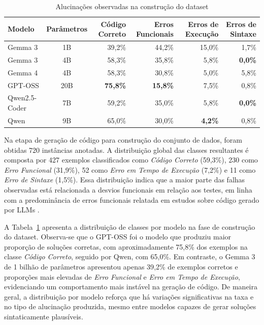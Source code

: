 \documentclass[conference]{IEEEtran}
\begin{document}
\begin{table}[!htbp]
    \centering
    \caption{Alucinações observadas na construção do dataset}
    \label{tab:dataset_construcao_modelos}

    \small
    \begin{tabular}{lcrrrr}
        \toprule
        \textbf{Modelo} & \textbf{Parâmetros} & \textbf{Código Correto} & \textbf{Erros Funcionais} & \textbf{Erros de Execução} & \textbf{Erros de Sintaxe} \\
        \midrule
        Gemma 3        & 1B   & 39{,}2\% & 44{,}2\% & 15{,}0\% & 1{,}7\% \\
        Gemma 3        & 4B   & 58{,}3\% & 35{,}8\% & 5{,}8\%  & \textbf{0{,}0\%} \\
        Gemma 4        & 4B   & 58{,}3\% & 30{,}8\% & 5{,}0\%  & 5{,}8\% \\
        GPT-OSS        & 20B  & \textbf{75{,}8\%} & \textbf{15{,}8\%} & 7{,}5\%  & 0{,}8\% \\
        Qwen2.5-Coder  & 7B   & 59{,}2\% & 35{,}0\% & 5{,}8\%  & \textbf{0{,}0\%} \\
        Qwen            & 9B   & 65{,}0\% & 30{,}0\% & \textbf{4{,}2\%} & 0{,}8\% \\
        \bottomrule
    \end{tabular}
\end{table}



Na etapa de geração de código para construção do conjunto de dados, foram obtidas 720 instâncias anotadas. A distribuição global das classes resultantes é composta por 427 exemplos classificados como \emph{Código Correto} (59{,}3\%), 230 como \emph{Erro Funcional} (31{,}9\%), 52 como \emph{Erro em Tempo de Execução} (7{,}2\%) e 11 como \emph{Erro de Sintaxe} (1{,}5\%). Essa distribuição indica que a maior parte das falhas observadas está relacionada a desvios funcionais em relação aos testes, em linha com a predominância de erros funcionais relatada em estudos sobre código gerado por LLMs \cite{2407.06153,2504.20799}.

A Tabela~\ref{tab:dataset_construcao_modelos} apresenta a distribuição de classes por modelo na fase de construção do dataset. Observa-se que o GPT-OSS foi o modelo que produziu maior proporção de soluções corretas, com aproximadamente 75{,}8\% dos exemplos na classe \emph{Código Correto}, seguido por Qwen, com 65{,}0\%. Em contraste, o Gemma 3 de 1 bilhão de parâmetros apresentou apenas 39{,}2\% de exemplos corretos e proporções mais elevadas de \emph{Erro Funcional} e \emph{Erro em Tempo de Execução}, evidenciando um comportamento mais instável na geração de código. De maneira geral, a distribuição por modelo reforça que há variações significativas na taxa e no tipo de alucinação produzida, mesmo entre modelos capazes de gerar soluções sintaticamente plausíveis.
\end{document}
